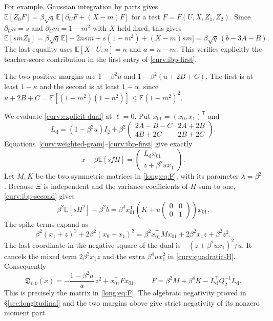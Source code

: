 \documentclass[11pt,reqno]{amsart}
\begin{document}
For example, Gaussian integration
by parts gives
$\mathbb E[Z_0F]=\beta\sqrt q\,\mathbb E[\partial_UF+(X-m)F]$
for a test $F=F(U,X,Z_1,Z_2)$. Since $\partial_Un=s$ and
$\partial_Um=1-m^2$ with $X$ held fixed, this gives
\[
 \mathbb E[smZ_0]
 =\beta\sqrt q\,\mathbb E\bigl[-2nsm+s(1-m^2)+(X-m)sm\bigr]
 =\beta\sqrt q\,(b-3A-B).
\]
The last equality uses $\mathbb E[X\mid U,n]=n$ and $a=n-m$.
This verifies explicitly the teacher-score contribution in the first
entry of \eqref{curv:ibp-first}.

The two positive margins are $1-\beta^2u$ and
$1-\beta^2(u+2B+C)$. The first is at least $1-\kappa$ and the second
is at least $1-\alpha$, since
$u+2B+C=\mathbb E[(1-m^2)(1-n^2)]
                 \le\mathbb E(1-m^2)^2$.

We evaluate \eqref{curv:explicit-dual} at $\ell=0$. Put
$x_{01}=(x_0,x_1)^{\mathsf T}$ and
\[
 L_{\mathrm d}=(1-\beta^2u)I_2+\beta^2
       \begin{pmatrix}
       2A-B-C&2A+2B\\
       4B+2C&2B+2C
       \end{pmatrix}.
\]
Equations~\eqref{curv:weighted-gram}--\eqref{curv:ibp-first} give exactly
\begin{equation*}
 x-\beta\mathbb E[sfH]
       =\begin{pmatrix}L_{\mathrm d}x_{01}\\z+\beta^2u x_1\end{pmatrix}.
\end{equation*}
Let $M,K$ be the two symmetric matrices in
\eqref{long:eq:F}, with its parameter $\lambda=\beta^2$. Because
$\Xi$ is independent and the variance coefficients of $H$ sum to one,
\eqref{curv:ibp-second} gives
\begin{equation}\label{curv:quadratic-H}
 \beta^2\mathbb E[sH^2]-\beta^2b
       =\beta^4x_{01}^{\mathsf T}
          \left(K+u\begin{pmatrix}0&0\\0&1\end{pmatrix}\right)x_{01}.
\end{equation}
The spike terms expand as
\[
 \beta^2(x_1+z)^2+2\beta^2(x_0+x_1)^2
       =\beta^2x_{01}^{\mathsf T}Mx_{01}
                            +2\beta^2x_1z+\beta^2z^2.
\]
The last coordinate in the negative square of the dual is
$-(z+\beta^2u x_1)^2/u$. It cancels the mixed term
$2\beta^2x_1z$ and the extra $\beta^4u x_1^2$ in
\eqref{curv:quadratic-H}. Consequently
\begin{equation*}
 \mathfrak D_{t,0}(x)=
  -\frac{1-\beta^2u}{u}\,z^2+x_{01}^{\mathsf T}F x_{01},
 \qquad
 F=\beta^2M+\beta^4K-L_{\mathrm d}^{\mathsf T}Q_2^{-1}L_{\mathrm d}.
\end{equation*}
This is precisely the matrix in \eqref{long:eq:F}. The algebraic
negativity proved in \S\ref{sec:longitudinal} and the two margins
above give strict negativity of its nonzero moment part.
\end{document}
